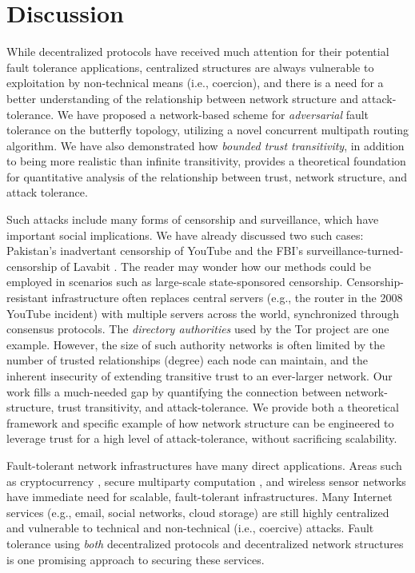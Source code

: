 \documentclass[sigconf]{acmart}
\begin{document}
\section{Discussion}
\label{sec-discussion}

While decentralized protocols have received much attention for their potential
fault tolerance applications,
centralized structures are always vulnerable to exploitation by non-technical means (i.e., coercion),
and there is a need for a better understanding of the relationship between network
structure and attack-tolerance.
We have proposed a network-based scheme for {\em adversarial} fault tolerance on the
butterfly topology,
utilizing a novel concurrent multipath routing algorithm.
We have also demonstrated how {\em bounded trust transitivity},
in addition to being more realistic than infinite transitivity,
provides a theoretical foundation for
quantitative analysis of the relationship between trust,
network structure, and attack tolerance.

Such attacks include many forms of censorship and surveillance,
which have important social implications.
We have already discussed two such cases:
Pakistan's inadvertant censorship of YouTube
\cite{hunter_pakistan_2008}
and the FBI's surveillance-turned-censorship of Lavabit
\cite{poulsen_edward_2013}.
The reader may wonder how our methods could be employed in scenarios
such as large-scale state-sponsored censorship.
Censorship-resistant infrastructure often replaces central servers
(e.g., the router in the 2008 YouTube incident) with multiple servers across
the world, synchronized through consensus protocols.
The {\em directory authorities} used by the Tor project
\cite{dingledine_tor:_2004} are one example.
However, the size of such authority networks is often limited by the number of
trusted relationships (degree) each node can maintain, and the inherent insecurity of
extending transitive trust to an ever-larger network.
Our work fills a much-needed gap by quantifying the connection between network-structure,
trust transitivity,
and attack-tolerance.
We provide both a theoretical framework and specific example of how network structure
can be engineered to leverage trust for a high level of attack-tolerance,
without sacrificing scalability.

Fault-tolerant network infrastructures have many direct applications.
Areas such as cryptocurrency
\cite{mazieres_stellar_2015,nakamoto_bitcoin:_2008,king_ppcoin:_2012},
secure multiparty computation
\cite{yao_protocols_1982,chaum_multiparty_1988,goldreich_how_1987},
and wireless sensor networks
\cite{khiani_comparative_2013}
have immediate need for scalable, fault-tolerant infrastructures.
Many Internet services (e.g., email, social networks, cloud storage)
are still highly centralized and vulnerable to technical and
non-technical (i.e., coercive) attacks.
Fault tolerance using {\em both}
decentralized protocols and
decentralized network structures
is one promising approach to securing these services.
\end{document}
